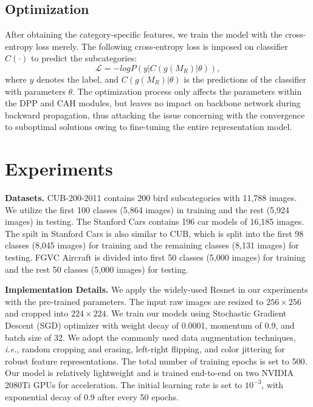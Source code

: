 \documentclass[letterpaper]{article} %
\begin{document}
\subsection{Optimization}

After obtaining the category-specific features, we train the model with the cross-entropy loss merely. The following cross-entropy loss is imposed on classifier $ C(\cdot) $ to predict the subcategories:
\begin{equation}
\mathcal{L} = - log P(y|C(g(M_R)|\theta)),
\end{equation}
where $ y $ denotes the label, and $ C(g(M_R)|\theta) $ is the predictions of the classifier with parameters $ \theta $. The optimization process only affects the parameters within the DPP and CAH modules, but leaves no impact on backbone network during backward propagation, thus attacking the issue concerning with the convergence to suboptimal solutions owing to fine-tuning the entire representation model.



\section{Experiments}
\noindent\textbf{Datasets.} CUB-200-2011 \cite{Branson2014Bird} contains 200 bird subcategories with 11,788 images. We utilize the first 100 classes (5,864 images) in training and the rest (5,924 images) in testing. The Stanford Cars \cite{Krause20133D} contains 196 car models of 16,185 images. The spilt in Stanford Cars \cite{Krause20133D} is also similar to CUB, which is split into the first 98 classes (8,045 images) for training and the remaining classes (8,131 images) for testing. FGVC Aircraft \cite{DBLP:journals/corr/MajiRKBV13} is divided into first 50 classes (5,000 images) for training and the rest 50 classes (5,000 images) for testing.



\textbf{Implementation Details.}
We apply the widely-used Resnet \cite{He2015Deep} in our experiments with the pre-trained parameters. The input raw images are resized to $ 256 \times 256 $ and cropped into $ 224 \times 224 $. We train our models using Stochastic Gradient Descent (SGD) optimizer with weight decay of 0.0001, momentum of 0.9, and batch size of 32.
We adopt the commonly used data augmentation techniques, \textit{i.e.}, random cropping and erasing, left-right flipping, and color jittering for robust feature representations. The total number of training epochs is set to 500. Our model is relatively lightweight and is trained end-to-end on two NVIDIA 2080Ti GPUs for acceleration.
The initial learning rate is set to $ 10^{-3} $, with exponential decay of 0.9 after every 50 epochs.
\end{document}
